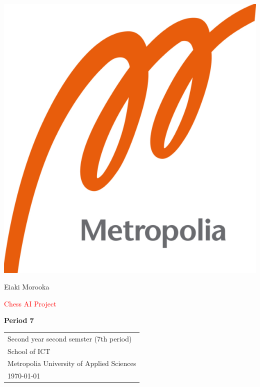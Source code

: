 \documentclass{article}
\begin{document}
\begin{center}
\includegraphics[scale=0.2]{logo.png}
\end{center}

\vspace{0.5cm}

\begin{center}

 Eiaki Morooka \\

\vspace{0.5cm}

{\Huge \textcolor{red}{Chess AI Project}} \\


\vspace{0.5cm}

{\Large \textbf{Period 7}} \\


\end{center}

\vspace{1cm}

\begin{center}

{\Large }



\begin{tabular}{l}
 Second year second semster (7th period)\\
 School of ICT\\
 Metropolia University of Applied Sciences  \\
 \today
\end{tabular}
\end{center}
\end{document}
